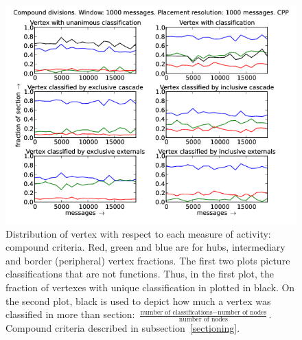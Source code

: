 \documentclass[%
 aip,
 jmp,%
 amsmath,amssymb,
 reprint,%
]{revtex4-1}
\begin{document}
\begin{figure}[hbtp] 
   \centering
        \includegraphics[width=\textwidth]{figs/CPP/1000_2}
    \caption{Distribution of vertex with respect to each measure of activity: compound criteria. Red, green and blue are for hubs, intermediary and border (peripheral) vertex fractions. The first two plots picture classifications that are not functions. Thus, in the first plot, the fraction of vertexes with unique classification in plotted in black. On the second plot, black is used to depict how much a vertex was classified in more than section: $\frac{\text{number of classifications} - \text{number of nodes}}{\text{number of nodes}}$. Compound criteria described in subsection~\ref{sectioning}.}
    \label{fig:cpp1000_}
\end{figure}
\end{document}
